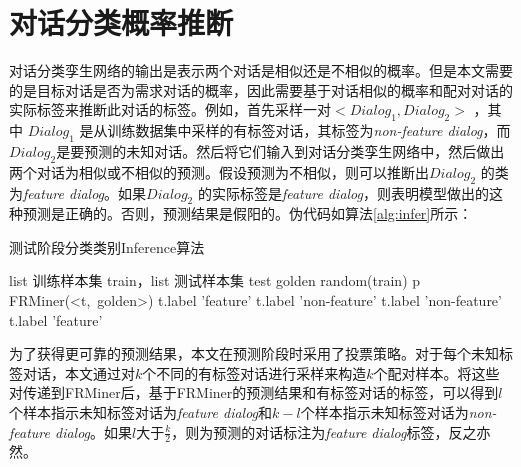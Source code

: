\section{对话分类概率推断}
对话分类孪生网络的输出是表示两个对话是相似还是不相似的概率。但是本文需要的是目标对话是否为需求对话的概率，因此需要基于对话相似的概率和配对对话的实际标签来推断此对话的标签。例如，首先采样一对$<Dialog_1,Dialog_2>$ ，其中 $Dialog_1$ 是从训练数据集中采样的有标签对话，其标签为\textit{non-feature dialog}，而 $Dialog_2$是要预测的未知对话。然后将它们输入到对话分类孪生网络中，然后做出两个对话为相似或不相似的预测。假设预测为不相似，则可以推断出$Dialog_2$ 的类为\textit{feature dialog}。如果$Dialog_2$ 的实际标签是\textit{feature dialog}，则表明模型做出的这种预测是正确的。否则，预测结果是假阳的。伪代码如算法\ref{alg:infer}所示：
    \begin{algorithm}[!htb]
            \caption{测试阶段分类类别Inference算法}  
            \label{alg:infer}
            \begin{algorithmic}[1]
                \Require list 训练样本集 train，list 测试样本集 test
                    \State golden \gets random(train)
                    \State p \gets FRMiner(<t,\ golden>)
                        \State t.label \gets 'feature'
                        \EndIf
                        \State t.label \gets 'non-feature'
                        \EndIf
                    \EndIf
                        \State t.label \gets 'non-feature'
                        \EndIf
                        \State t.label \gets 'feature'
                        \EndIf
                    \EndIf
                    \EndFor
                \EndFunction  
            \end{algorithmic}  
    \end{algorithm}
    
为了获得更可靠的预测结果，本文在预测阶段时采用了投票策略。对于每个未知标签对话，本文通过对$k$个不同的有标签对话进行采样来构造$k$个配对样本。将这些对传递到FRMiner后，基于FRMiner的预测结果和有标签对话的标签，可以得到$l$个样本指示未知标签对话为\textit{feature dialog}和$k-l$个样本指示未知标签对话为\textit{non-feature dialog}。如果$l$大于$\frac{k}{2}$，则为预测的对话标注为\textit{feature dialog}标签，反之亦然。

